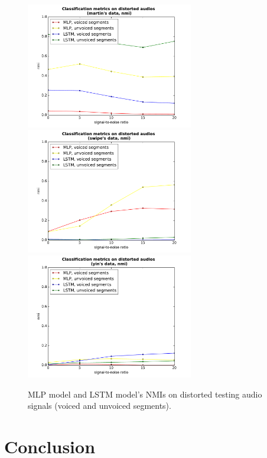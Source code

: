 \documentclass[11pt,a4paper]{report}
\begin{document}
\begin{figure}[htbp]
  \centering
  \includegraphics[width=0.65\textwidth]{classification_metrics_voicedness_martin_nmi.pdf}
  \includegraphics[width=0.65\textwidth]{classification_metrics_voicedness_swipe_nmi.pdf}
  \includegraphics[width=0.65\textwidth]{classification_metrics_voicedness_yin_nmi.pdf}
  \caption{MLP model and LSTM model's NMIs on distorted testing audio signals (voiced and unvoiced segments).}
  \label{fig:distorted-testing-data-nmi-voicedness}
\end{figure}

\chapter{Conclusion}
\end{document}
